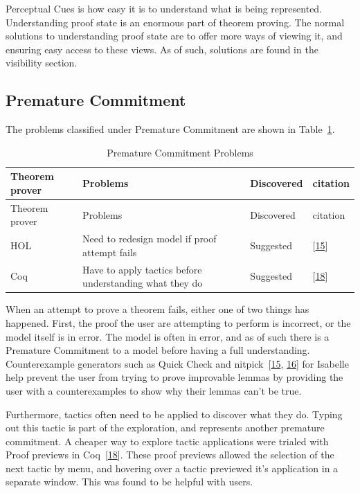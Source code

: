 \documentclass[
]{article}
\begin{document}
Perceptual Cues is how easy it is to understand what is being
represented. Understanding proof state is an enormous part of theorem
proving. The normal solutions to understanding proof state are to offer
more ways of viewing it, and ensuring easy access to these views. As of
such, solutions are found in the visibility section.

\hypertarget{premature-commitment}{%
\subsection{Premature Commitment}\label{premature-commitment}}

The problems classified under Premature Commitment are shown in
Table~\ref{tbl:premature_commitment}.

\hypertarget{tbl:premature_commitment}{}
\begin{longtable}[]{@{}llll@{}}
\caption{\label{tbl:premature_commitment}Premature Commitment
Problems}\tabularnewline
\toprule
Theorem prover & Problems & Discovered & citation \\
\midrule
\endfirsthead
\toprule
Theorem prover & Problems & Discovered & citation \\
\midrule
\endhead
HOL & Need to redesign model if proof attempt fails & Suggested &
{[}\protect\hyperlink{ref-beckert_usability_2015}{15}{]} \\
Coq & Have to apply tactics before understanding what they do &
Suggested & {[}\protect\hyperlink{ref-berman_development_2014}{18}{]} \\
\bottomrule
\end{longtable}

When an attempt to prove a theorem fails, either one of two things has
happened. First, the proof the user are attempting to perform is
incorrect, or the model itself is in error. The model is often in error,
and as of such there is a Premature Commitment to a model before having
a full understanding. Counterexample generators such as Quick Check and
nitpick~{[}\protect\hyperlink{ref-beckert_usability_2015}{15},
\protect\hyperlink{ref-beckert_interaction_2017}{16}{]} for Isabelle
help prevent the user from trying to prove improvable lemmas by
providing the user with a counterexamples to show why their lemmas can't
be true.

Furthermore, tactics often need to be applied to discover what they do.
Typing out this tactic is part of the exploration, and represents
another premature commitment. A cheaper way to explore tactic
applications were trialed with Proof previews in
Coq~{[}\protect\hyperlink{ref-berman_development_2014}{18}{]}. These
proof previews allowed the selection of the next tactic by menu, and
hovering over a tactic previewed it's application in a separate window.
This was found to be helpful with users.
\end{document}
